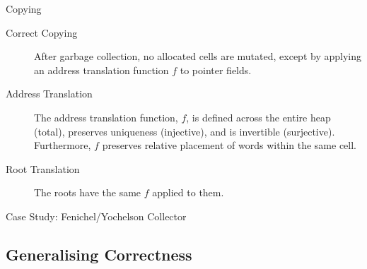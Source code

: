 \documentclass[usenames,dvipsnames]{beamer}
\begin{document}
\begin{frame}{Copying}
  \begin{description}
  \item[Correct Copying] After garbage collection, no allocated cells
    are mutated, except by applying an address translation function
    $f$ to pointer fields.

  \item[Address Translation] The address translation function, $f$, is
    defined across the entire heap (total), preserves uniqueness
    (injective), and is invertible (surjective). Furthermore, $f$
    preserves relative placement of words within the same cell.

  \item[Root Translation] The roots have the same $f$ applied to them.
  \end{description}

  Case Study: Fenichel/Yochelson Collector


\end{frame}

\subsection{Generalising Correctness}
\end{document}
